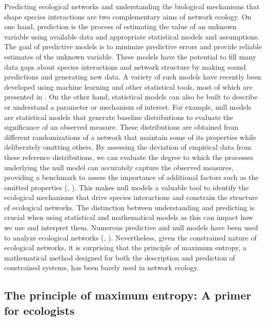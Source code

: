 Predicting ecological networks and understanding the biological mechanisms that
shape species interactions are two complementary aims of network ecology. On one
hand, prediction is the process of estimating the value of an unknown variable
using available data and appropriate statistical models and assumptions. The
goal of predictive models is to minimize predictive errors and provide reliable
estimates of the unknown variable. These models have the potential to fill many
data gaps about species interactions and network structure by making sound
predictions and generating new data. A variety of such models have recently been
developed using machine learning and other statistical tools, most of which are
presented in \cite{Strydom2021Roadmapa}. On the other hand, statistical models can
also be built to describe or understand a parameter or mechanism of interest.
For example, null models are statistical models that generate baseline
distributions to evaluate the significance of an observed measure. These
distributions are obtained from different randomizations of a network that
maintain some of its properties while deliberately omitting others. By assessing
the deviation of empirical data from these reference distributions, we can
evaluate the degree to which the processes underlying the null model can
accurately capture the observed measures, providing a benchmark to assess the
importance of additional factors such as the omitted properties
(\cite{Fortuna2006Habitat}, \cite{Delmas2019Analysing}). This makes null models a
valuable tool to identify the ecological mechanisms that drive species
interactions and constrain the structure of ecological networks. The distinction
between understanding and predicting is crucial when using statistical and
mathematical models as this can impact how we use and interpret them. Numerous
predictive and null models have been used to analyze ecological networks
(\cite{Delmas2019Analysing}, \cite{Strydom2021Roadmapa}). Nevertheless, given the
constrained nature of ecological networks, it is surprising that the principle
of maximum entropy, a mathematical method designed for both the description and
prediction of constrained systems, has been barely used in network ecology. 

\subsection{The principle of maximum entropy: A primer for ecologists}

